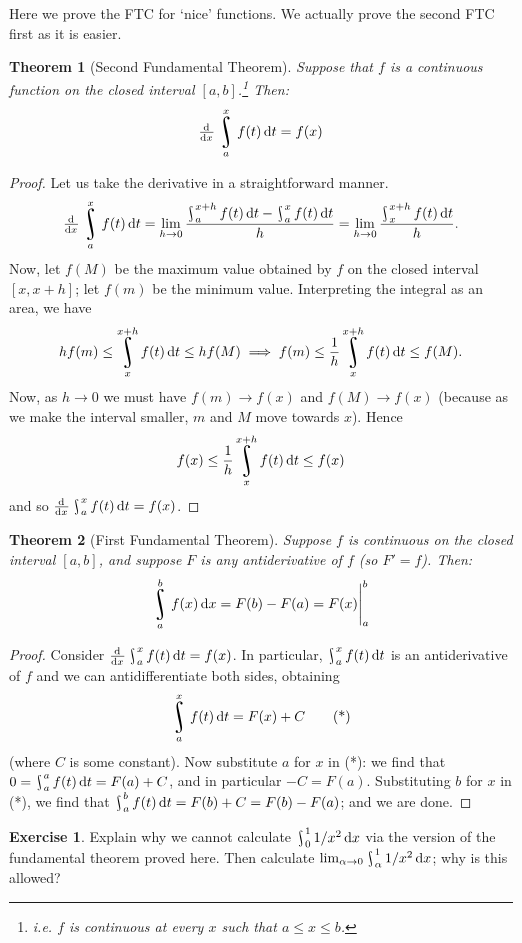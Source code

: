 \documentclass{amsart}
\newtheorem*{thm}{Theorem}
\theoremstyle{definition}
\newtheorem*{exercise}{Exercise}
\DeclareMathOperator*{\rint}{\scalerel*{\rotatebox{17}{$\!\int\!$}}{\int}}
\begin{document}
Here we prove the FTC for `nice' functions. We actually prove the second FTC first as it is easier.

\begin{thm}[Second Fundamental Theorem]
  Suppose that $ f $ is a continuous function on the closed interval $ [a,b] $.\footnote{i.e. $ f $ is continuous at every $ x $ such that $ a \leq x \leq b $.} Then:
  \begin{displaymath}
    \od{}{x} \rint^x_a f(t) \dif{t} = f(x)
  \end{displaymath}
\end{thm}

\begin{proof}
  Let us take the derivative in a straightforward manner.
  \begin{displaymath}
    \od{}{x} \rint^x_a f(t) \dif{t} = \lim_{h \to 0} \frac{\rint^{x + h}_a f(t) \dif{t} - \rint^{x}_a f(t) \dif{t}}{h}
                                    = \lim_{h \to 0} \frac{\rint^{x + h}_x f(t) \dif{t}}{h}.
  \end{displaymath}
  Now, let $ f(M) $ be the maximum value obtained by $ f $ on the closed interval $ [x,x+h] $; let $ f(m) $ be the minimum value. Interpreting the integral as
  an area, we have
  \begin{displaymath}
    hf(m) \leq \rint^{x + h}_x f(t) \dif{t} \leq hf(M) \implies f(m) \leq \frac{1}{h} \rint^{x + h}_x f(t) \dif{t} \leq f(M).
  \end{displaymath}
  Now, as $ h \to 0 $ we must have $ f(m) \to f(x) $ and $ f(M) \to f(x) $ (because as we make the interval smaller, $ m $ and $ M $ move towards $ x $). Hence
  \begin{displaymath}
    f(x) \leq \frac{1}{h} \rint^{x + h}_x f(t) \dif{t} \leq f(x)
  \end{displaymath}
  and so $ \od{}{x} \rint^x_a f(t) \dif{t} = f(x) $.
\end{proof}

\begin{thm}[First Fundamental Theorem]
  Suppose $ f $ is continuous on the closed interval $ [a,b] $, and suppose $ F $ is any antiderivative of $ f $ (so $ F' = f $). Then:
  \begin{displaymath}
    \rint^b_a f(x) \dif{x} = F(b) - F(a) = \eval{F(x)}_a^b
  \end{displaymath}
\end{thm}

\begin{proof}
  Consider $ \od{}{x} \rint^x_a f(t) \dif{t} = f(x) $. In particular, $ \rint^x_a f(t) \dif{t} $ is an antiderivative of $ f $ and we can antidifferentiate both
  sides, obtaining
  \begin{equation}\label{eqn:ftc1}
    \rint^x_a f(t) \dif{t} = F(x) + C \tag{*}
  \end{equation}
  (where $ C $ is some constant). Now substitute $ a $ for $ x $ in (*): we find that $ 0 = \rint^a_a f(t) \dif{t} = F(a) + C $, and in particular $ -C = F(a) $.
  Substituting $ b $ for $ x $ in (*), we find that $ \rint^b_a f(t) \dif{t} = F(b) + C = F(b) - F(a) $; and we are done.
\end{proof}

\begin{exercise}
  Explain why we cannot calculate $ \rint^1_0 1/x^2 \dif{x} $ via the version of the fundamental theorem proved here. Then
  calculate $ \lim_{\alpha \to 0} \rint^1_\alpha 1/x^2 \dif{x} $; why is this allowed?
\end{exercise}
\end{document}
